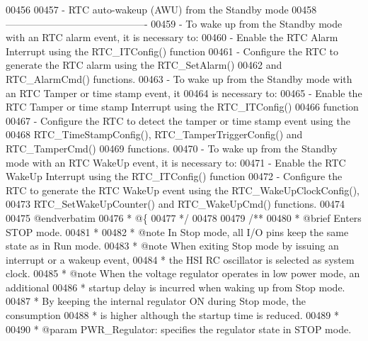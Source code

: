 \begin{DoxyCode}
00456 \textcolor{comment}{}
00457 \textcolor{comment}{   - RTC auto-wakeup (AWU) from the Standby mode}
00458 \textcolor{comment}{     -------------------------------------------}
00459 \textcolor{comment}{     - To wake up from the Standby mode with an RTC alarm event, it is necessary to:}
00460 \textcolor{comment}{       - Enable the RTC Alarm Interrupt using the RTC\_ITConfig() function}
00461 \textcolor{comment}{       - Configure the RTC to generate the RTC alarm using the RTC\_SetAlarm() }
00462 \textcolor{comment}{         and RTC\_AlarmCmd() functions.}
00463 \textcolor{comment}{     - To wake up from the Standby mode with an RTC Tamper or time stamp event, it }
00464 \textcolor{comment}{       is necessary to:}
00465 \textcolor{comment}{       - Enable the RTC Tamper or time stamp Interrupt using the RTC\_ITConfig() }
00466 \textcolor{comment}{         function}
00467 \textcolor{comment}{       - Configure the RTC to detect the tamper or time stamp event using the}
00468 \textcolor{comment}{         RTC\_TimeStampConfig(), RTC\_TamperTriggerConfig() and RTC\_TamperCmd()}
00469 \textcolor{comment}{         functions.}
00470 \textcolor{comment}{     - To wake up from the Standby mode with an RTC WakeUp event, it is necessary to:}
00471 \textcolor{comment}{       - Enable the RTC WakeUp Interrupt using the RTC\_ITConfig() function}
00472 \textcolor{comment}{       - Configure the RTC to generate the RTC WakeUp event using the RTC\_WakeUpClockConfig(), }
00473 \textcolor{comment}{         RTC\_SetWakeUpCounter() and RTC\_WakeUpCmd() functions.}
00474 \textcolor{comment}{}
00475 \textcolor{comment}{@endverbatim}
00476 \textcolor{comment}{  * @\{}
00477 \textcolor{comment}{  */}
00478 
00479 \textcolor{comment}{/**}
00480 \textcolor{comment}{  * @brief  Enters STOP mode.}
00481 \textcolor{comment}{  *   }
00482 \textcolor{comment}{  * @note   In Stop mode, all I/O pins keep the same state as in Run mode.}
00483 \textcolor{comment}{  * @note   When exiting Stop mode by issuing an interrupt or a wakeup event, }
00484 \textcolor{comment}{  *         the HSI RC oscillator is selected as system clock.}
00485 \textcolor{comment}{  * @note   When the voltage regulator operates in low power mode, an additional }
00486 \textcolor{comment}{  *         startup delay is incurred when waking up from Stop mode. }
00487 \textcolor{comment}{  *         By keeping the internal regulator ON during Stop mode, the consumption }
00488 \textcolor{comment}{  *         is higher although the startup time is reduced.           }
00489 \textcolor{comment}{  *     }
00490 \textcolor{comment}{  * @param  PWR\_Regulator: specifies the regulator state in STOP mode.}

\end{DoxyCode}
